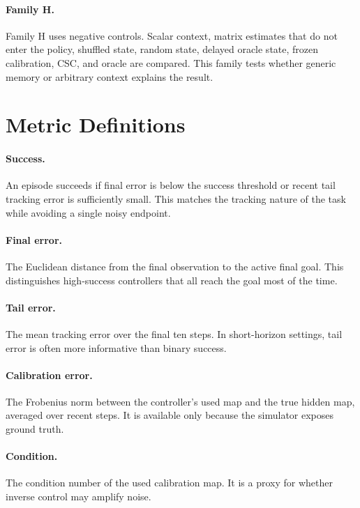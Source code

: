 \documentclass{article}
\begin{document}
\paragraph{Family H.}
Family H uses negative controls. Scalar context, matrix estimates that do not
enter the policy, shuffled state, random state, delayed oracle state, frozen
calibration, CSC, and oracle are compared. This family tests whether generic
memory or arbitrary context explains the result.

\section{Metric Definitions}

\paragraph{Success.}
An episode succeeds if final error is below the success threshold or recent
tail tracking error is sufficiently small. This matches the tracking nature of
the task while avoiding a single noisy endpoint.

\paragraph{Final error.}
The Euclidean distance from the final observation to the active final goal.
This distinguishes high-success controllers that all reach the goal most of
the time.

\paragraph{Tail error.}
The mean tracking error over the final ten steps. In short-horizon settings,
tail error is often more informative than binary success.

\paragraph{Calibration error.}
The Frobenius norm between the controller's used map and the true hidden map,
averaged over recent steps. It is available only because the simulator exposes
ground truth.

\paragraph{Condition.}
The condition number of the used calibration map. It is a proxy for whether
inverse control may amplify noise.
\end{document}
